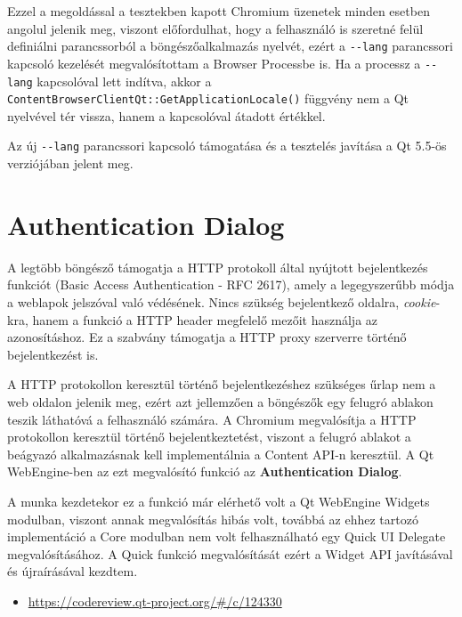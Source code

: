 \documentclass[12pt]{report}
\let\origurl\url
\renewcommand{\url}[1]{%
    \textcolor{blue}{\origurl{#1}}
}
\newcommand{\gerrit}[1]{%
    \textcolor{qtgreen}{\origurl{https://codereview.qt-project.org/\#/c/#1}}
}
\begin{document}
Ezzel a megoldással a tesztekben kapott Chromium üzenetek minden esetben angolul jelenik meg,
viszont előfordulhat, hogy a felhasználó is szeretné felül definiálni parancssorból a
böngészőalkalmazás nyelvét, ezért  a \texttt{-{}-lang} parancssori kapcsoló kezelését
megvalósítottam a Browser Processbe is. Ha a processz a \texttt{-{}-lang} kapcsolóval lett
indítva, akkor a \texttt{ContentBrowserClientQt::GetApplicationLocale()} függvény nem
a Qt nyelvével tér vissza, hanem a kapcsolóval átadott értékkel.

Az új \texttt{-{}-lang} parancssori kapcsoló támogatása és a tesztelés javítása a Qt 5.5-ös
verziójában jelent meg.


\section{Authentication Dialog}

A legtöbb böngésző támogatja a HTTP protokoll által nyújtott bejelentkezés funkciót
(Basic Access Authentication - RFC 2617), amely a legegyszerűbb módja a weblapok jelszóval
való védésének. Nincs szükség bejelentkező oldalra, \textit{cookie}-kra, hanem a funkció a
HTTP header megfelelő mezőit használja az azonosításhoz. Ez a szabvány támogatja a
HTTP proxy szerverre történő bejelentkezést is.

A HTTP protokollon keresztül történő bejelentkezéshez szükséges űrlap nem a web
oldalon jelenik meg, ezért azt jellemzően a böngészők egy felugró ablakon teszik láthatóvá
a felhasználó számára. A Chromium megvalósítja a HTTP protokollon keresztül történő
bejelentkeztetést, viszont a felugró ablakot a beágyazó alkalmazásnak kell implementálnia
a Content API-n keresztül. A Qt WebEngine-ben az ezt megvalósító funkció az
\textbf{Authentication Dialog}.

A munka kezdetekor ez a funkció már elérhető volt a Qt WebEngine Widgets modulban, viszont
annak megvalósítás hibás volt, továbbá az ehhez tartozó implementáció a Core modulban nem
volt felhasználható egy Quick UI Delegate megvalósításához. A Quick funkció megvalósítását
ezért a Widget API javításával és újraírásával kezdtem.

\begin{center}
    \begin{reviewbox}
        \begin{itemize}
            \renewcommand{\labelitemi}{\textcolor{qtgreen}{$\blacktriangleright$}}
            \item \gerrit{124330}
        \end{itemize}
    \end{reviewbox}
\end{center}
\end{document}
